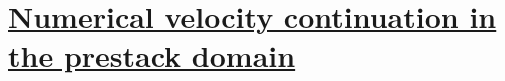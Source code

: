 \begin{comment}
  space coordinate.}
\par
The second advantage is the compactness of the Chebyshev
representation.  Figure \ref{fig:cheb1-fft} shows the data after the
decomposition into Chebyshev polynomials in $\xi$ and Fourier
transform in $x$. We observe a very rapid convergence of the Chebyshev
representation: a relatively small number of polynomials suffices to
represent the data.
\par
\plot{cheb-impl}{width=6in}{Impulse responses (Green's functions) of
  velocity continuation, computed by the Chebyshev-$\tau$ method. Top:
  without zero padding, bottom: with zero padding on the $x$ axis. The
  left plots correspond to continuation to a larger velocity ($+1$
  km/sec); the right plots, smaller velocity, ($-1$ km/sec).}
\par
The third advantage is the proper handling of the non-periodic boundary
conditions. Figure \ref{fig:cheb-impl} shows the velocity continuation
impulse responses, computed by the Chebyshev method. As expected, no
wraparound artifacts occur on the time axis, and the accuracy of the
result is noticeably higher than in the case of finite differences
(Figure \ref{fig:fd-imp}).

\section{Data tests}
\end{comment}

\section{\uline{Numerical velocity continuation in the prestack domain}}

